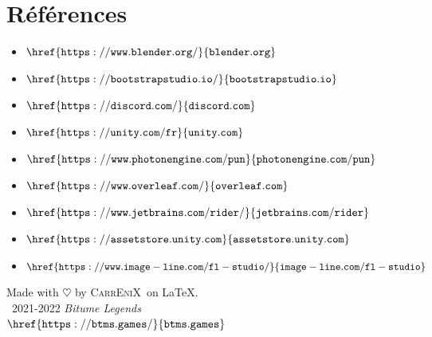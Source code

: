 \documentclass[12pt,a4paper]{article}
\newcommand{\btmlgs}{\textsl{Bitume Legends}}
\newcommand{\CEX}{\textsc{CarrEniX}}
\begin{document}
\section*{Références}
    \begin{itemize}
        \item \(\mathtt{\href{https://www.blender.org/}{blender.org}}\)
        \item \(\mathtt{\href{https://bootstrapstudio.io/}{bootstrapstudio.io}}\)
        \item \(\mathtt{\href{https://discord.com/}{discord.com}}\)
        \item \(\mathtt{\href{https://unity.com/fr}{unity.com}}\)
        \item \(\mathtt{\href{https://www.photonengine.com/pun}{photonengine.com/pun}}\)
        \item \(\mathtt{\href{https://www.overleaf.com/}{overleaf.com}}\)
        \item \(\mathtt{\href{https://www.jetbrains.com/rider/}{jetbrains.com/rider}}\)
        \item \(\mathtt{\href{https://assetstore.unity.com}{assetstore.unity.com}}\)
        \item \(\mathtt{\href{https://www.image-line.com/fl-studio/}{image-line.com/fl-studio}}\)\\[9cm]
    \end{itemize}

\begin{center}
    Made with $\heartsuit$ by \CEX\, on \LaTeX.\\
    \textcopyright\, 2021-2022 \btmlgs\\
    \(\mathtt{\href{https://btms.games/}{btms.games}}\)
\end{center}

\clearpage
{}
\end{document}
